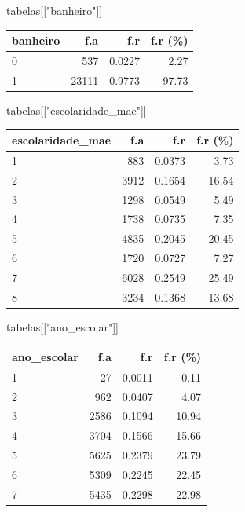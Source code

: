 \documentclass[
]{article}
\newenvironment{Shaded}{\begin{snugshade}}{\end{snugshade}}
\newcommand{\NormalTok}[1]{\textcolor[rgb]{0.00,0.23,0.31}{#1}}
\newcommand{\StringTok}[1]{\textcolor[rgb]{0.13,0.47,0.30}{#1}}
\begin{document}
\begin{Shaded}
\begin{Highlighting}[]
\NormalTok{tabelas[[}\StringTok{"banheiro"}\NormalTok{]]}
\end{Highlighting}
\end{Shaded}

\begin{longtable}[]{@{}lrrr@{}}
\toprule()
banheiro & f.a & f.r & f.r (\%) \\
\midrule()
\endhead
0 & 537 & 0.0227 & 2.27 \\
1 & 23111 & 0.9773 & 97.73 \\
\bottomrule()
\end{longtable}

\begin{Shaded}
\begin{Highlighting}[]
\NormalTok{tabelas[[}\StringTok{"escolaridade\_mae"}\NormalTok{]]}
\end{Highlighting}
\end{Shaded}

\begin{longtable}[]{@{}lrrr@{}}
\toprule()
escolaridade\_mae & f.a & f.r & f.r (\%) \\
\midrule()
\endhead
1 & 883 & 0.0373 & 3.73 \\
2 & 3912 & 0.1654 & 16.54 \\
3 & 1298 & 0.0549 & 5.49 \\
4 & 1738 & 0.0735 & 7.35 \\
5 & 4835 & 0.2045 & 20.45 \\
6 & 1720 & 0.0727 & 7.27 \\
7 & 6028 & 0.2549 & 25.49 \\
8 & 3234 & 0.1368 & 13.68 \\
\bottomrule()
\end{longtable}

\begin{Shaded}
\begin{Highlighting}[]
\NormalTok{tabelas[[}\StringTok{"ano\_escolar"}\NormalTok{]]}
\end{Highlighting}
\end{Shaded}

\begin{longtable}[]{@{}lrrr@{}}
\toprule()
ano\_escolar & f.a & f.r & f.r (\%) \\
\midrule()
\endhead
1 & 27 & 0.0011 & 0.11 \\
2 & 962 & 0.0407 & 4.07 \\
3 & 2586 & 0.1094 & 10.94 \\
4 & 3704 & 0.1566 & 15.66 \\
5 & 5625 & 0.2379 & 23.79 \\
6 & 5309 & 0.2245 & 22.45 \\
7 & 5435 & 0.2298 & 22.98 \\
\bottomrule()
\end{longtable}
\end{document}
